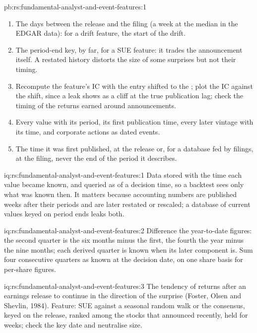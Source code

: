 \begin{solution}{pb:rs:fundamental-analyst-and-event-features:1}
\begin{enumerate}
\item The days between the release and the filing (a week at the median in the EDGAR data): for a drift feature, the start of the drift.
\item The period-end key, by far, for a SUE feature: it trades the announcement itself. A restated history distorts the size of some surprises
but not their timing.
\item Recompute the feature's IC with the entry shifted to the ; plot the IC against the shift, since a leak shows as a
cliff at the true publication lag; check the timing of the returns earned around announcements.
\item Every value with its period, its first publication time, every later vintage with its time, and corporate actions as dated events.
\item The time it was first published, at the release or, for a database fed by filings, at the filing, never the end of the period it describes.
\end{enumerate}
\end{solution}

\begin{solution}{iq:rs:fundamental-analyst-and-event-features:1}
Data stored with the time each value became known, and queried as of a decision time, so a backtest sees only what was known then. It matters
because accounting numbers are published weeks after their periods and are later restated or rescaled; a database of current values keyed on
period ends leaks both.
\end{solution}

\begin{solution}{iq:rs:fundamental-analyst-and-event-features:2}
Difference the year-to-date figures: the second quarter is the six months minus the first, the fourth the year minus the nine months; each derived
quarter is known when its later component is. Sum four consecutive quarters as known at the decision date, on one share basis for per-share figures.
\end{solution}

\begin{solution}{iq:rs:fundamental-analyst-and-event-features:3}
The tendency of returns after an earnings release to continue in the direction of the surprise (Foster, Olsen and Shevlin, 1984). Feature: SUE
against a seasonal random walk or the consensus, keyed on the release, ranked among the stocks that announced recently, held for weeks; check
the key date and neutralise size.
\end{solution}

